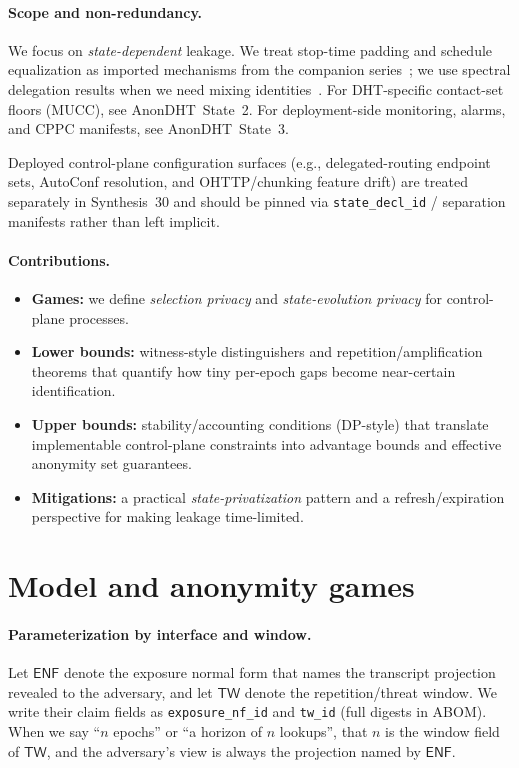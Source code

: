 \documentclass[11pt]{article}
\begin{document}
\paragraph{Scope and non-redundancy.}
We focus on \emph{state-dependent} leakage.
We treat stop-time padding and schedule equalization as imported mechanisms from the companion series~\cite{series:stoptimeaddendum,series:schedcompiler};
we use spectral delegation results when we need mixing identities~\cite{series:spectral}.
For DHT-specific contact-set floors (MUCC), see AnonDHT~State~2.\cite{series:state2}
For deployment-side monitoring, alarms, and CPPC manifests, see AnonDHT~State~3.\cite{series:state3}

Deployed control-plane configuration surfaces (e.g., delegated-routing endpoint sets, AutoConf resolution, and OHTTP/chunking feature drift) are treated separately in Synthesis~30 and should be pinned via \texttt{state\_decl\_id} / separation manifests rather than left implicit.\cite{series:deployedsurfaces}

\paragraph{Contributions.}
\begin{itemize}[leftmargin=*]
\item \textbf{Games:} we define \emph{selection privacy} and \emph{state-evolution privacy} for control-plane processes.
\item \textbf{Lower bounds:} witness-style distinguishers and repetition/amplification theorems that quantify how tiny per-epoch gaps become near-certain identification.
\item \textbf{Upper bounds:} stability/accounting conditions (DP-style) that translate implementable control-plane constraints into advantage bounds and effective anonymity set guarantees.
\item \textbf{Mitigations:} a practical \emph{state-privatization} pattern and a refresh/expiration perspective for making leakage time-limited.
\end{itemize}


\section{Model and anonymity games}

\paragraph{Parameterization by interface and window.}
Let \(\mathsf{ENF}\) denote the exposure normal form that names the transcript projection revealed to the adversary, and let \(\mathsf{TW}\) denote the repetition/threat window.
We write their claim fields as \texttt{exposure\_nf\_id} and \texttt{tw\_id} (full digests in ABOM).
When we say ``\(n\) epochs'' or ``a horizon of \(n\) lookups'', that \(n\) is the window field of \(\mathsf{TW}\), and the adversary's view is always the projection named by \(\mathsf{ENF}\).
\end{document}
